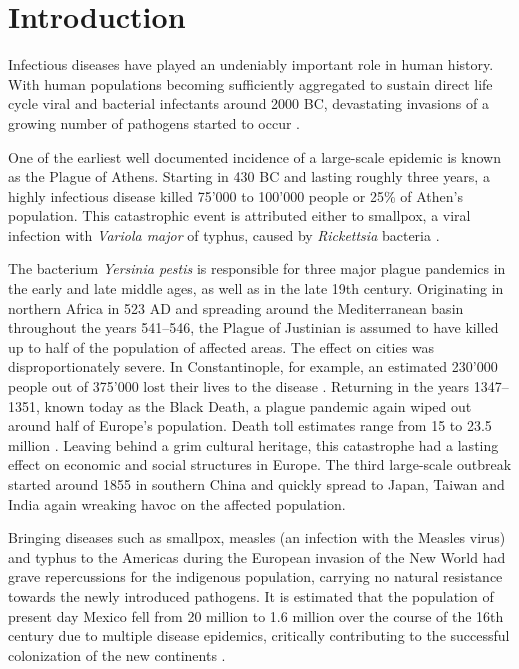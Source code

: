\chapter{Introduction}

Infectious diseases have played an undeniably important role in human history. With human populations becoming sufficiently aggregated to sustain direct life cycle viral and bacterial infectants around 2000 BC, devastating invasions of a growing number of pathogens started to occur \citep{Dobson1996}.

One of the earliest well documented incidence of a large-scale epidemic is known as the Plague of Athens. Starting in 430 BC and lasting roughly three years, a highly infectious disease killed 75'000 to 100'000 people or 25\% of Athen's population. This catastrophic event is attributed either to smallpox, a viral infection with \textit{Variola major} of typhus, caused by \textit{Rickettsia} bacteria \citep{Littman2009}.

The bacterium \textit{Yersinia pestis} is responsible for three major plague pandemics in the early and late middle ages, as well as in the late 19th century. Originating in northern Africa in 523 AD and spreading around the Mediterranean basin throughout the years 541--546, the Plague of Justinian is assumed to have killed up to half of the population of affected areas. The effect on cities was disproportionately severe. In Constantinople, for example, an estimated 230'000 people out of 375'000 lost their lives to the disease \citep{Treadgold1997}. Returning in the years 1347--1351, known today as the Black Death, a plague pandemic again wiped out around half of Europe's population. Death toll estimates range from 15 to 23.5 million \citep{Zietz2004}. Leaving behind a grim cultural heritage, this catastrophe had a lasting effect on economic and social structures in Europe. The third large-scale outbreak started around 1855 in southern China and quickly spread to Japan, Taiwan and India again wreaking havoc on the affected population.

Bringing diseases such as smallpox, measles (an infection with the Measles virus) and typhus to the Americas during the European invasion of the New World had grave repercussions for the indigenous population, carrying no natural resistance towards the newly introduced pathogens. It is estimated that the population of present day Mexico fell from 20 million to 1.6 million over the course of the 16th century due to multiple disease epidemics, critically contributing to the successful colonization of the new continents \citep{Dobson1996}.

